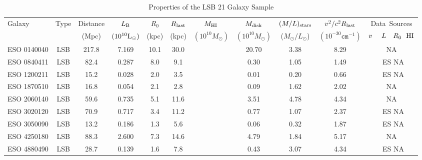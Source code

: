 \documentclass[preprint,aps]{revtex4}
\begin{document}
\begin{table}
\caption{Properties of the LSB 21 Galaxy Sample}
\centering
\begin{tabular}{l c c c c c c c c c c} 
\hline\hline
\phantom{00}Galaxy  & \phantom{0}Type \phantom{0}&Distance  & $L_{\rm  B}$ & $R_0$  & $R_{\rm last} $ &  $M_{\rm HI} $ & $M_{\rm disk}$ &  $ 
(M/L) _{\rm stars}$ & $v^2 / c^2 R_{\rm last}$ & Data~Sources \\  
& &  (Mpc)  &  $(10^{10}{\rm L}_{\odot})$&(kpc) & (kpc) & {$(10^{10} M_\odot)$} & {$(10^{10}
M_\odot)$} & ({$M_{\odot}/L_{\odot}$}) & {$(10^{-30}\texttt{cm}^{-1})$} & $v~~~~L~~~R_0~~{\rm HI}$\\
\hline
ESO 0140040&LSB& 217.8 &  \phantom{0}7.169   &10.1 & 30.0 & ~~ &20.70&\phantom{0}3.38 &8.29 & \cite{McGaugh2001} \cite{deBlok2001} \cite{Beijersbergen1999} NA     
\\
ESO 0840411 &LSB &\phantom{0}82.4 &  \phantom{0}0.287    &8.0 & \phantom{0}9.1 & ~~
&\phantom{0}0.30 & \phantom{0}1.05 &1.49 & \cite{McGaugh2001} \cite{deBlok2001} ~ES NA    
\\
ESO 1200211 &LSB & \phantom{0}15.2 &   \phantom{0}0.028   &2.0 & \phantom{0}3.5 & ~~
&\phantom{0}0.01 & \phantom{0}0.20 &0.66 & \cite{McGaugh2001} \cite{deBlok2001} ~ES NA   
 \\
ESO 1870510 & LSB& \phantom{0}16.8 &    \phantom{0}0.054  & 2.1 & \phantom{0}2.8 &~~
&\phantom{0}0.09 & \phantom{0}1.62 &2.02 & \cite{McGaugh2001} \cite{deBlok2001} \cite{Bell2000} NA    
\\
ESO 2060140 & LSB & \phantom{0}59.6 &    \phantom{0}0.735 & 5.1 & 11.6 & ~~ &  \phantom{0}3.51 & \phantom{0}4.78 & 4.34 & \cite{McGaugh2001} \cite{deBlok2001} \cite{Beijersbergen1999} NA    
\\
ESO 3020120 & LSB & \phantom{0}70.9 &   \phantom{0}0.717   & 3.4 & 11.2 & ~~ & \phantom{0}0.77 & \phantom{0}1.07 & 2.37 &\cite{McGaugh2001} \cite{deBlok2001} ~ES NA   
\\
ESO 3050090 & LSB & \phantom{0}13.2 &  \phantom{0}0.186    &1.3& \phantom{0}5.6 & ~~ &
\phantom{0}0.06 & \phantom{0}0.32 & 1.87 & \cite{McGaugh2001} \cite{deBlok2001} ~ES NA   
\\
ESO 4250180 & LSB & \phantom{0}88.3 &  \phantom{0}2.600    & 7.3 & 14.6 & ~~ &\phantom{0}4.79 &\phantom{0}1.84 &5.17 
& \cite{McGaugh2001} \cite{deBlok2001} \cite{Beijersbergen1999} NA   
\\
ESO 4880490 &LSB & \phantom{0}28.7 &  \phantom{0}0.139    & 1.6 & 7.8 & ~~ &\phantom{0}0.43 &\phantom{0}3.07 & 4.34 & \cite{McGaugh2001} \cite{deBlok2001} ~ES NA     

\end{tabular}
\end{table}
\end{document}
